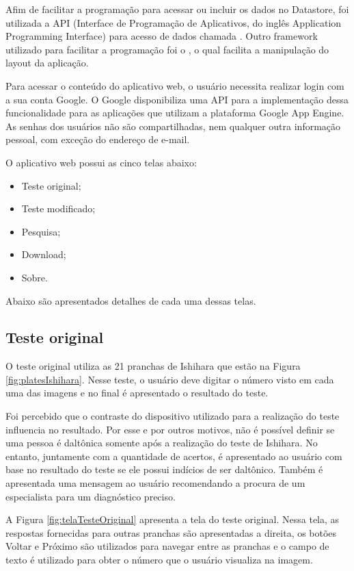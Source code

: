 \documentclass[	12pt, Times, openright, twoside, a4paper, english, brazil]{abntex2}
\begin{document}
Afim de facilitar a programação para acessar ou incluir os dados no Datastore, foi utilizada a API (Interface de Programação de Aplicativos, do inglês Application Programming Interface) para acesso de dados chamada . Outro framework utilizado para facilitar a programação foi o , o qual facilita a manipulação do layout da aplicação.

Para acessar o conteúdo do aplicativo web, o usuário necessita realizar login com a sua conta Google. O Google disponibiliza uma API para a implementação dessa funcionalidade para as aplicações que utilizam a plataforma Google App Engine. As senhas dos usuários não são compartilhadas, nem qualquer outra informação pessoal, com exceção do endereço de e-mail. 

O aplicativo web possui as cinco telas abaixo:

\begin{itemize}
\item Teste original;
\item Teste modificado;
\item Pesquisa;
\item Download;
\item Sobre.
\end{itemize}

Abaixo são apresentados detalhes de cada uma dessas telas.

\subsection{Teste original}
O teste original utiliza as 21 pranchas de Ishihara que estão na Figura \ref{fig:platesIshihara}. Nesse teste, o usuário deve digitar o número visto em cada uma das imagens e no final é apresentado o resultado do teste. 

Foi percebido que o contraste do dispositivo utilizado para a realização do teste influencia no resultado. Por esse e por outros motivos, não é possível definir se uma pessoa é daltônica somente após a realização do teste de Ishihara. No entanto, juntamente com a quantidade de acertos, é apresentado ao usuário com base no resultado do teste se ele possui indícios de ser daltônico. Também é apresentada uma mensagem ao usuário recomendando a procura de um especialista para um diagnóstico preciso.

A Figura \ref{fig:telaTesteOriginal} apresenta a tela do teste original. Nessa tela, as respostas fornecidas para outras pranchas são apresentadas a direita, os botões Voltar e Próximo são utilizados para navegar entre as pranchas e o campo de texto é utilizado para obter o número que o usuário visualiza na imagem.
\end{document}
